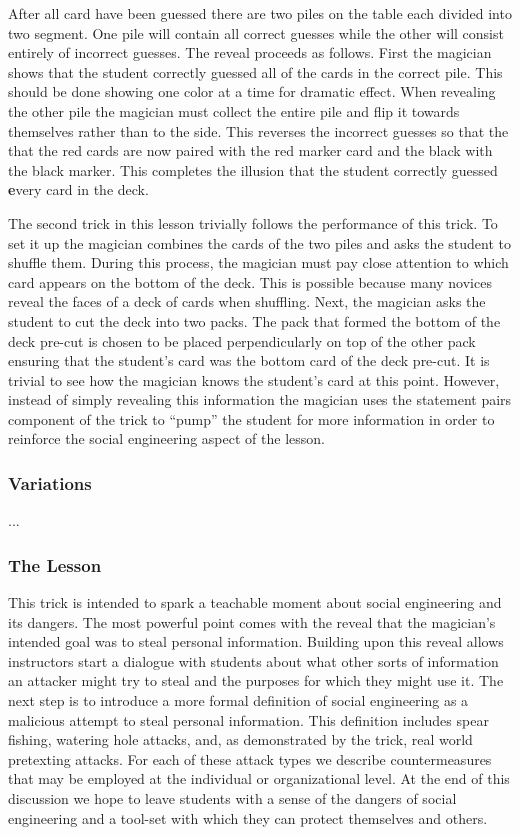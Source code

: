 After all card have been guessed there are two piles on the table each divided
into two segment.  One pile will contain all correct guesses while the other
will consist entirely of incorrect guesses.  The reveal proceeds as follows.
First the magician shows that the student correctly guessed all of the cards
in the correct pile.  This should be done showing one color at a time for
dramatic effect.  When revealing the other pile the magician must collect the
entire pile and flip it towards themselves rather than to the side.  This
reverses the incorrect guesses so that the that the red cards are now paired
with the red marker card and the black with the black marker.  This completes
the illusion that the student correctly guessed {\textbf every} card in the
deck.

The second trick in this lesson trivially follows the performance of this trick.
To set it up the magician combines the cards of the two piles and asks the
student to shuffle them.  During this process, the magician must pay close
attention to which card appears on the bottom of the deck.  This is possible
because many novices reveal the faces of a deck of cards when shuffling.  Next,
the magician asks the student to cut the deck into two packs.  The pack that
formed the bottom of the deck pre-cut is chosen to be placed perpendicularly on
top of the other pack ensuring that the student's card was the bottom card of
the deck pre-cut.  It is trivial to see how the magician knows the student's
card at this point.  However, instead of simply revealing this information the
magician uses the statement pairs component of the trick to ``pump'' the student
for more information in order to reinforce the social engineering aspect of the
lesson.

\subsubsection{Variations}

...

\subsubsection{The Lesson}

This trick is intended to spark a teachable moment about social engineering and
its dangers.  The most powerful point comes with the reveal that the magician's
intended goal was to steal personal information.
Building upon this reveal allows instructors start a dialogue with
students about what other
sorts of information an attacker might try to steal and the purposes for which
they might use it.
The next step is to introduce a more formal definition of social engineering as
a malicious attempt to steal personal information.  This definition includes
spear fishing, watering hole attacks, and, as demonstrated by the trick, real
world pretexting attacks.
For each of these attack types we describe countermeasures that may be employed
at the individual or organizational level.
At the end of this discussion we hope to leave students with a sense of the
dangers of social engineering and a tool-set with which they can protect
themselves and others.

